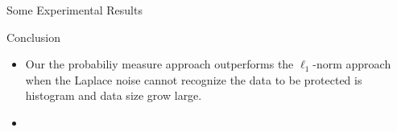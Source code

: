 \documentclass[final,hyperref={pdfpagelabels=false}]{beamer}
\begin{document}
\begin{frame}[t]
\begin{columns}[t]
\begin{column}{.485\textwidth}
\begin{block}{Some Experimental Results}
\end{block}




\begin{block}{Conclusion}

\begin{itemize}
  \item Our the probabiliy measure approach outperforms the $\ell_1$-norm approach when the Laplace noise cannot recognize the data to be protected is histogram and data size grow large.

  \item 
    


\end{itemize}
\end{block}









\end{column}
\end{columns}
\end{frame}
\end{document}
